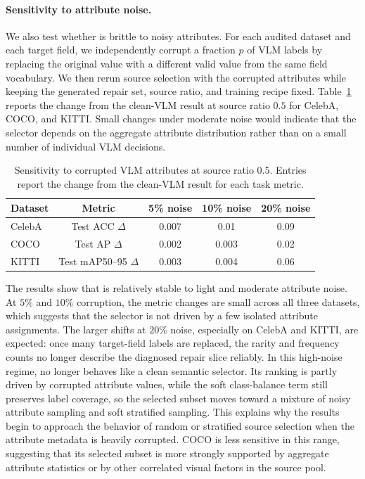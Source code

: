 \paragraph{Sensitivity to attribute noise.}
We also test whether \model is brittle to noisy attributes. For each audited dataset and each target field, we independently corrupt a fraction $p$ of VLM labels by replacing the original value with a different valid value from the same field vocabulary. We then rerun source selection with the corrupted attributes while keeping the generated repair set, source ratio, and training recipe fixed. Table~\ref{tab:attribute-noise-sensitivity} reports the change from the clean-VLM \model result at source ratio $0.5$ for CelebA, COCO, and KITTI. Small changes under moderate noise would indicate that the selector depends on the aggregate attribute distribution rather than on a small number of individual VLM decisions.

\begin{table}[htbp]
\centering
\caption{Sensitivity to corrupted VLM attributes at source ratio $0.5$. Entries report the change from the clean-VLM \model result for each task metric.}
\label{tab:attribute-noise-sensitivity}
\small
\setlength{\tabcolsep}{5pt}
\begin{tabular}{l c c c c}
\toprule
\rowcolor{sectiongray} \textbf{Dataset} & \textbf{Metric} & \textbf{5\% noise} & \textbf{10\% noise} & \textbf{20\% noise} \\
\midrule
CelebA & Test ACC $\Delta$ & 0.007 & 0.01 & 0.09 \\
COCO & Test AP $\Delta$ & 0.002 & 0.003 & 0.02 \\
KITTI & Test mAP50--95 $\Delta$ & 0.003 & 0.004 & 0.06 \\
\bottomrule
\end{tabular}
\end{table}

The results show that \model is relatively stable to light and moderate attribute noise. At $5\%$ and $10\%$ corruption, the metric changes are small across all three datasets, which suggests that the selector is not driven by a few isolated attribute assignments. The larger shifts at $20\%$ noise, especially on CelebA and KITTI, are expected: once many target-field labels are replaced, the rarity and frequency counts no longer describe the diagnosed repair slice reliably. In this high-noise regime, \model no longer behaves like a clean semantic selector. Its ranking is partly driven by corrupted attribute values, while the soft class-balance term still preserves label coverage, so the selected subset moves toward a mixture of noisy attribute sampling and soft stratified sampling. This explains why the results begin to approach the behavior of random or stratified source selection when the attribute metadata is heavily corrupted. COCO is less sensitive in this range, suggesting that its selected subset is more strongly supported by aggregate attribute statistics or by other correlated visual factors in the source pool.
